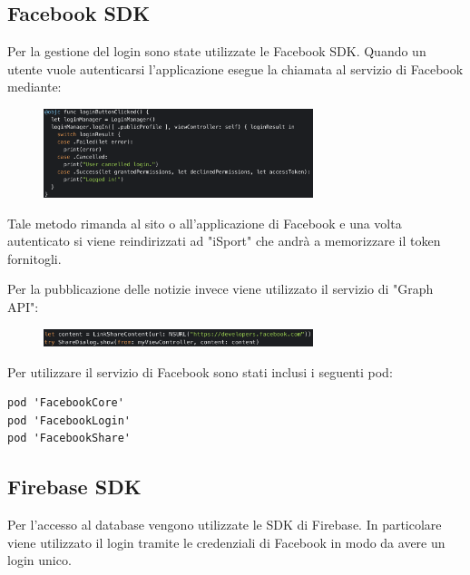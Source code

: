 \documentclass[numbers=noenddot, 12pt, a4paper, oneside]{scrbook}
\begin{document}
\subsection*{Facebook SDK}
Per la gestione del login sono state utilizzate le Facebook SDK. Quando un utente vuole autenticarsi l'applicazione esegue la chiamata al servizio di Facebook mediante:
\begin{figure}[H]
	\centering
	\includegraphics[width=0.7\textwidth]{images/LoginMethod}
\end{figure}
Tale metodo rimanda al sito o all'applicazione di Facebook e una volta autenticato si viene reindirizzati ad "iSport" che andrà a memorizzare il token fornitogli.

Per la pubblicazione delle notizie invece viene utilizzato il servizio di "Graph API":
\begin{figure}[H]
	\centering
	\includegraphics[width=0.7\textwidth]{images/GraphAPI}
\end{figure}

Per utilizzare il servizio di Facebook sono stati inclusi i seguenti pod:
\begin{lstlisting}[style=CStyle]
pod 'FacebookCore'
pod 'FacebookLogin'
pod 'FacebookShare'
\end{lstlisting}

\subsection*{Firebase SDK}
Per l'accesso al database vengono utilizzate le SDK di Firebase. In particolare viene utilizzato il login tramite le credenziali di Facebook in modo da avere un login unico.
\end{document}
